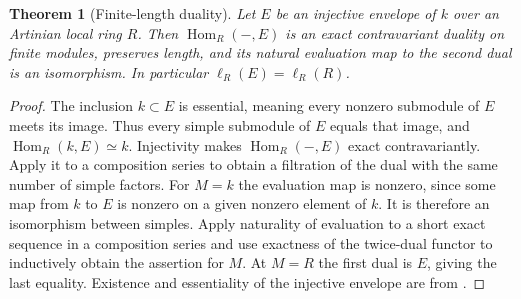 \documentclass[11pt,oneside,openany]{book}
\newtheorem{theorem}{Theorem}[chapter]
\theoremstyle{definition}
\theoremstyle{remark}
\begin{document}
\begin{theorem}[Finite-length duality]\label{res:GC-04}
Let $E$ be an injective envelope of $k$ over an Artinian local
ring $R$. Then $\operatorname{Hom}_R(-,E)$ is an exact
contravariant duality on finite modules, preserves length,
and its natural evaluation map to the second dual is an
isomorphism. In particular $\ell_R(E)=\ell_R(R)$.
\end{theorem}
\begin{proof}
The inclusion $k\subset E$ is essential, meaning every nonzero
submodule of $E$ meets its image. Thus every simple submodule
of $E$ equals that image, and $\operatorname{Hom}_R(k,E)\simeq k$.
Injectivity makes $\operatorname{Hom}_R(-,E)$ exact
contravariantly. Apply it to a composition series to obtain
a filtration of the dual with the same number of simple factors.
For $M=k$ the evaluation map is nonzero, since some map from
$k$ to $E$ is nonzero on a given nonzero element of $k$. It
is therefore an isomorphism between simples. Apply naturality
of evaluation to a short exact sequence in a composition
series and use exactness of the twice-dual functor to
inductively obtain the assertion for $M$. At $M=R$ the first
dual is $E$, giving the last equality. Existence and essentiality
of the injective envelope are from \cite[Chapter 2]{p103}.
\end{proof}
\end{document}
